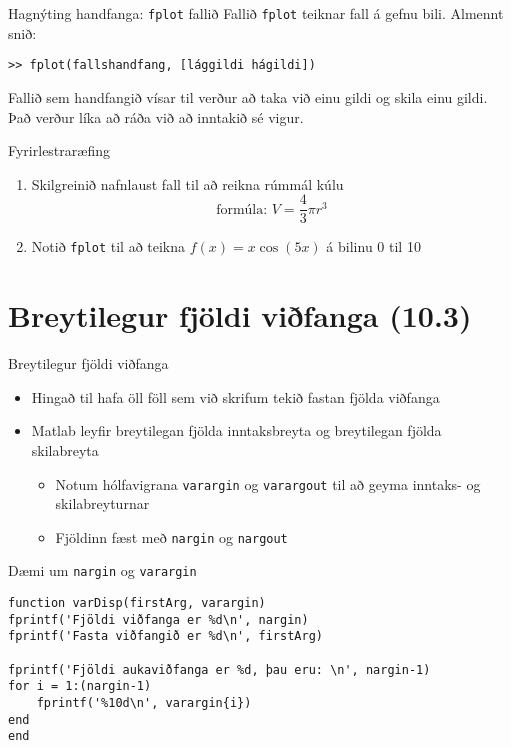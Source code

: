 \documentclass{beamer}
\begin{document}
\begin{frame}[fragile]{Hagnýting handfanga: \texttt{fplot} fallið}
Fallið \texttt{fplot} teiknar fall á gefnu bili. Almennt snið:
\begin{verbatim}
>> fplot(fallshandfang, [lággildi hágildi])
\end{verbatim}
Fallið sem handfangið vísar til verður að taka við einu gildi og skila einu gildi. Það verður líka að ráða við að inntakið sé vigur.
\end{frame}

\begin{frame}{Fyrirlestraræfing}
\begin{enumerate}
 \item Skilgreinið nafnlaust fall til að reikna rúmmál kúlu
 \[
  \text{formúla: } V = \frac{4}{3} \pi r^3
 \]
 \item Notið \texttt{fplot} til að teikna $f(x) = x\cos(5x)$ á bilinu 0 til 10
\end{enumerate}
\end{frame}

\section{Breytilegur fjöldi viðfanga (10.3)}

\begin{frame}{Breytilegur fjöldi viðfanga}
\begin{itemize}
 \item Hingað til hafa öll föll sem við skrifum tekið fastan fjölda viðfanga
 \item Matlab leyfir breytilegan fjölda inntaksbreyta og breytilegan fjölda skilabreyta
 \begin{itemize}
  \item Notum hólfavigrana \texttt{varargin} og \texttt{varargout} til að geyma inntaks- og skilabreyturnar
  \item Fjöldinn fæst með \texttt{nargin} og \texttt{nargout}
 \end{itemize}
\end{itemize}
\end{frame}

\begin{frame}[fragile]{Dæmi um \texttt{nargin} og \texttt{varargin}}
\begin{verbatim}
function varDisp(firstArg, varargin)
fprintf('Fjöldi viðfanga er %d\n', nargin)
fprintf('Fasta viðfangið er %d\n', firstArg)

fprintf('Fjöldi aukaviðfanga er %d, þau eru: \n', nargin-1)
for i = 1:(nargin-1)
    fprintf('%10d\n', varargin{i})
end
end
\end{verbatim}
\end{frame}
\end{document}
